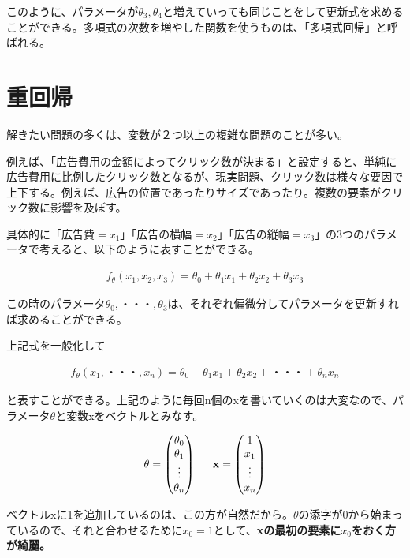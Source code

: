 \documentclass{jsarticle}
\begin{document}
このように、パラメータが$\theta_3,\theta_4$と増えていっても同じことをして更新式を求めることができる。多項式の次数を増やした関数を使うものは、「多項式回帰」と呼ばれる。


\section{重回帰}
解きたい問題の多くは、変数が２つ以上の複雑な問題のことが多い。

例えば、「広告費用の金額によってクリック数が決まる」と設定すると、単純に広告費用に比例したクリック数となるが、現実問題、クリック数は様々な要因で上下する。例えば、広告の位置であったりサイズであったり。複数の要素がクリック数に影響を及ぼす。

具体的に「広告費$=x_1$」「広告の横幅$=x_2$」「広告の縦幅$=x_3$」の3つのパラメータで考えると、以下のように表すことができる。

\begin{align}
	f_\theta(x_1,x_2,x_3) = \theta_0 + \theta_1 x_1 + \theta_2 x_2 + \theta_3 x_3
\end{align}

この時のパラメータ$\theta_0,・・・,\theta_3$は、それぞれ偏微分してパラメータを更新すれば求めることができる。

上記式を一般化して

\begin{align}
	f_\theta(x_1,・・・,x_n) = \theta_0 + \theta_1 x_1 + \theta_2 x_2 + ・・・ + \theta_n x_n
\end{align}

と表すことができる。上記のように毎回n個のxを書いていくのは大変なので、パラメータ$\theta$と変数xをベクトルとみなす。

\begin{align}
  	\bf{\theta} = \begin{pmatrix} 
      \theta_0\\
      \theta_1\\
      \vdots\\
      \theta_n
	\end{pmatrix}
    \hspace{15pt}
    \bf{x} = \begin{pmatrix} 
      1\\
      x_1\\
      \vdots\\
      x_n
	\end{pmatrix}
\end{align}

ベクトルxに1を追加しているのは、この方が自然だから。$\theta$の添字が0から始まっているので、それと合わせるために$x_0=1$として、\bf{x}の最初の要素に$x_0$をおく方が綺麗。
\end{document}
